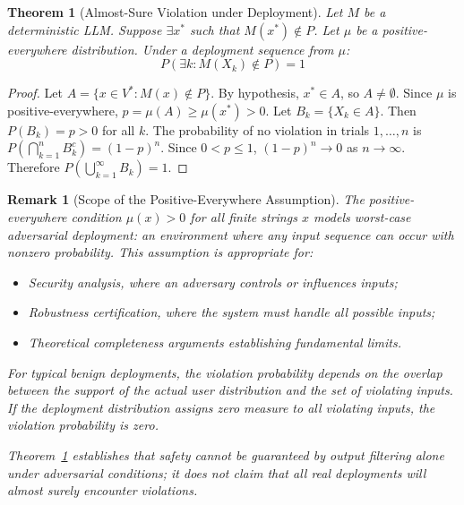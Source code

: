 \documentclass[11pt,a4paper]{article}
\newtheorem{theorem}{Theorem}[section]
\newtheorem*{remark}{Remark}
\begin{document}
\begin{theorem}[Almost-Sure Violation under Deployment]
\label{thm:almost-sure}
Let $M$ be a deterministic LLM. Suppose $\exists x^*$ such that $M(x^*) \notin P$. Let $\mu$ be a positive-everywhere distribution. Under a deployment sequence from $\mu$:
\begin{equation}
P(\exists k : M(X_k) \notin P) = 1
\end{equation}
\end{theorem}

\begin{proof}
Let $A = \{x \in V^* : M(x) \notin P\}$. By hypothesis, $x^* \in A$, so $A \neq \emptyset$. Since $\mu$ is positive-everywhere, $p = \mu(A) \geq \mu(x^*) > 0$. Let $B_k = \{X_k \in A\}$. Then $P(B_k) = p > 0$ for all $k$. The probability of no violation in trials $1, \ldots, n$ is $P(\bigcap_{k=1}^n B_k^c) = (1-p)^n$. Since $0 < p \leq 1$, $(1-p)^n \to 0$ as $n \to \infty$. Therefore $P(\bigcup_{k=1}^\infty B_k) = 1$.
\end{proof}

\begin{remark}[Scope of the Positive-Everywhere Assumption]
\label{rem:positive-scope}
The positive-everywhere condition $\mu(x) > 0$ for all finite strings $x$ models \emph{worst-case adversarial deployment}: an environment where any input sequence can occur with nonzero probability. This assumption is appropriate for:
\begin{itemize}
    \item Security analysis, where an adversary controls or influences inputs;
    \item Robustness certification, where the system must handle all possible inputs;
    \item Theoretical completeness arguments establishing fundamental limits.
\end{itemize}

For typical benign deployments, the violation probability depends on the overlap between the support of the actual user distribution and the set of violating inputs. If the deployment distribution assigns zero measure to all violating inputs, the violation probability is zero.

Theorem~\ref{thm:almost-sure} establishes that safety cannot be guaranteed by output filtering alone under adversarial conditions; it does \emph{not} claim that all real deployments will almost surely encounter violations.
\end{remark}
\end{document}
